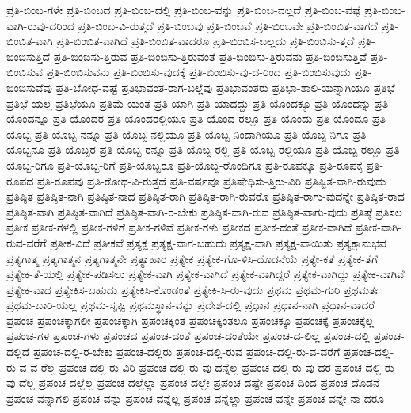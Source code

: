 {ಪ್ರತಿ-ಬಿಂಬ-ಗಳೇ
ಪ್ರತಿ-ಬಿಂಬದ
ಪ್ರತಿ-ಬಿಂಬ-ದಲ್ಲಿ
ಪ್ರತಿ-ಬಿಂಬ-ವನ್ನು
ಪ್ರತಿ-ಬಿಂಬ-ವಲ್ಲದೆ
ಪ್ರತಿ-ಬಿಂಬ-ವಷ್ಟೆ
ಪ್ರತಿ-ಬಿಂಬ-ವಾಗಿ-ರುವು-ದರಿಂದ
ಪ್ರತಿ-ಬಿಂಬ-ವಿ-ರುತ್ತದೆ
ಪ್ರತಿ-ಬಿಂಬವು
ಪ್ರತಿ-ಬಿಂಬವೆ
ಪ್ರತಿ-ಬಿಂಬವೇ
ಪ್ರತಿ-ಬಿಂಬಿತ-ವಾಗದೆ
ಪ್ರತಿ-ಬಿಂಬಿತ-ವಾಗಿ
ಪ್ರತಿ-ಬಿಂಬಿತ-ವಾಗಿದೆ
ಪ್ರತಿ-ಬಿಂಬಿತ-ವಾದರೂ
ಪ್ರತಿ-ಬಿಂಬಿಸ-ಬಲ್ಲದು
ಪ್ರತಿ-ಬಿಂಬಿಸು-ತ್ತದೆ
ಪ್ರತಿ-ಬಿಂಬಿಸುತ್ತಿದೆ
ಪ್ರತಿ-ಬಿಂಬಿಸು-ತ್ತಿರುವ
ಪ್ರತಿ-ಬಿಂಬಿಸು-ತ್ತಿರುವಂತೆ
ಪ್ರತಿ-ಬಿಂಬಿಸು-ತ್ತಿರುವನು
ಪ್ರತಿ-ಬಿಂಬಿಸುತ್ತಿವೆ
ಪ್ರತಿ-ಬಿಂಬಿಸುವ
ಪ್ರತಿ-ಬಿಂಬಿಸುವನು
ಪ್ರತಿ-ಬಿಂಬಿಸು-ವುದಕ್ಕೆ
ಪ್ರತಿ-ಬಿಂಬಿಸು-ವು-ದ-ರಿಂದ
ಪ್ರತಿ-ಬಿಂಬಿಸುವುದು
ಪ್ರತಿ-ಬಿಂಬಿಸುವೆವು
ಪ್ರತಿ-ಬೋಧ-ವಷ್ಟೆ
ಪ್ರತಿಭಾವಂತ-ರಾಗ-ಬಲ್ಲೆವು
ಪ್ರತಿಭಾವಂತರು
ಪ್ರತಿಭಾ-ಶಾಲಿ-ಯನ್ನಾಗಿಯೂ
ಪ್ರತಿಭೆ
ಪ್ರತಿಭೆ-ಯಲ್ಲ
ಪ್ರತಿಭೆಯೂ
ಪ್ರತಿಮೆ-ಯಂತೆ
ಪ್ರತಿ-ಯಾಗಿ
ಪ್ರತಿ-ಯಾದದ್ದು
ಪ್ರತಿ-ಯೊಂದಕ್ಕೂ
ಪ್ರತಿ-ಯೊಂದನ್ನು
ಪ್ರತಿ-ಯೊಂದನ್ನೂ
ಪ್ರತಿ-ಯೊಂದರ
ಪ್ರತಿ-ಯೊಂದರಲ್ಲಿಯೂ
ಪ್ರತಿ-ಯೊಂದ-ರಲ್ಲೂ
ಪ್ರತಿ-ಯೊಂದು
ಪ್ರತಿ-ಯೊಂದೂ
ಪ್ರತಿ-ಯೊಬ್ಬ
ಪ್ರತಿ-ಯೊಬ್ಬ-ನನ್ನೂ
ಪ್ರತಿ-ಯೊಬ್ಬ-ನಲ್ಲಿಯೂ
ಪ್ರತಿ-ಯೊಬ್ಬ-ನಿಂದಾಗಿಯೂ
ಪ್ರತಿ-ಯೊಬ್ಬ-ನಿಗೂ
ಪ್ರತಿ-ಯೊಬ್ಬನೂ
ಪ್ರತಿ-ಯೊಬ್ಬರ
ಪ್ರತಿ-ಯೊಬ್ಬ-ರನ್ನೂ
ಪ್ರತಿ-ಯೊಬ್ಬ-ರಲ್ಲಿ
ಪ್ರತಿ-ಯೊಬ್ಬ-ರಲ್ಲಿಯೂ
ಪ್ರತಿ-ಯೊಬ್ಬ-ರಲ್ಲೂ
ಪ್ರತಿ-ಯೊಬ್ಬ-ರಿಗೂ
ಪ್ರತಿ-ಯೊಬ್ಬ-ರಿಗೆ
ಪ್ರತಿ-ಯೊಬ್ಬರೂ
ಪ್ರತಿ-ಯೊಬ್ಬ-ರೊಂದಿಗೂ
ಪ್ರತಿ-ರೂಪಕ್ಕೂ
ಪ್ರತಿ-ರೂಪಕ್ಕೆ
ಪ್ರತಿ-ರೂಪದ
ಪ್ರತಿ-ರೂಪವು
ಪ್ರತಿ-ರೋಧ-ವಿ-ರುತ್ತದೆ
ಪ್ರತಿ-ವರ್ಷವೂ
ಪ್ರತಿಷೇಧಿಸು-ತ್ತಿರು-ವಿರಿ
ಪ್ರತಿಷ್ಟಿತ-ವಾಗಿ-ರುವುದು
ಪ್ರತಿಷ್ಠಿತ
ಪ್ರತಿಷ್ಠಿತ-ನಾಗಿ
ಪ್ರತಿಷ್ಠಿತ-ನಾದ
ಪ್ರತಿಷ್ಠಿತ-ರಾಗಿ
ಪ್ರತಿಷ್ಠಿತ-ರಾಗಿ-ರುವರೊ
ಪ್ರತಿಷ್ಠಿತ-ರಾಗು-ವುದನ್ನೇ
ಪ್ರತಿಷ್ಠಿತ-ರಾದ
ಪ್ರತಿಷ್ಠಿತ-ವಾಗಿ
ಪ್ರತಿಷ್ಠಿತ-ವಾಗಿದೆ
ಪ್ರತಿಷ್ಠಿತ-ವಾಗಿ-ರ-ಬೇಕು
ಪ್ರತಿಷ್ಠಿತ-ವಾಗಿ-ರುವ
ಪ್ರತಿಷ್ಠಿತ-ವಾಗು-ವುದು
ಪ್ರತಿಷ್ಠೆ
ಪ್ರತಿಸಲ
ಪ್ರತೀಕ
ಪ್ರತೀಕ-ಗಳಲ್ಲಿ
ಪ್ರತೀಕ-ಗಳಿಗೆ
ಪ್ರತೀಕ-ಗಳಿವೆ
ಪ್ರತೀಕ-ಗಳು
ಪ್ರತೀಕದ
ಪ್ರತೀಕ-ದಂತೆ
ಪ್ರತೀಕ-ವಾಗಿದೆ
ಪ್ರತೀಕ-ವಾಗಿ-ರುವ-ವರೆಗೆ
ಪ್ರತೀಕ-ವಿದೆ
ಪ್ರತೀಕವೆ
ಪ್ರತ್ಯಕ್ಷ
ಪ್ರತ್ಯಕ್ಷ-ವಾಗ-ಬಹುದು
ಪ್ರತ್ಯಕ್ಷ-ವಾಗಿ
ಪ್ರತ್ಯಕ್ಷ-ವಾಯಿತು
ಪ್ರತ್ಯಕ್ಷಾನುಭವ
ಪ್ರತ್ಯಗಾತ್ಮ
ಪ್ರತ್ಯಗಾತ್ಮನ
ಪ್ರತ್ಯಗಾತ್ಮನೇ
ಪ್ರತ್ಯಾಹಾರ
ಪ್ರತ್ಯೇಕ
ಪ್ರತ್ಯೇಕ-ಗೊ-ಳಿಸಿ-ದೊಡನೆಯೆ
ಪ್ರತ್ಯೇ-ಕತೆ
ಪ್ರತ್ಯೇಕ-ತೆಗೆ
ಪ್ರತ್ಯೇಕ-ತೆ-ಯಲ್ಲಿ
ಪ್ರತ್ಯೇಕ-ಪಡಿಸಲು
ಪ್ರತ್ಯೇಕ-ವಾಗಿ
ಪ್ರತ್ಯೇಕ-ವಾಗಿದೆ
ಪ್ರತ್ಯೇಕ-ವಾಗಿದ್ದರೆ
ಪ್ರತ್ಯೇಕ-ವಾಗಿದ್ದು
ಪ್ರತ್ಯೇಕ-ವಾಗಿವೆ
ಪ್ರತ್ಯೇಕ-ವಾದ
ಪ್ರತ್ಯೇಕಿಸ-ಬಹುದು
ಪ್ರತ್ಯೇಕಿಸಿ-ಕೊಂಡಂತೆ
ಪ್ರತ್ಯೇಕಿ-ಸಿ-ರು-ವುದು
ಪ್ರಥಮ
ಪ್ರಥಮ-ಗುರಿ
ಪ್ರಥಮತಃ
ಪ್ರಥಮ-ಬಾರಿ-ಯಲ್ಲ
ಪ್ರಥಮ-ಸೃಷ್ಟಿ
ಪ್ರಥಮಸ್ಥಾನ-ವನ್ನು
ಪ್ರದೇಶ-ದಲ್ಲಿ
ಪ್ರಧಾನ
ಪ್ರಧಾನ-ನಾಗಿ
ಪ್ರಧಾನ-ವಾದರೆ
ಪ್ರಪಂಚ
ಪ್ರಪಂಚಕ್ಕಾಗಲೀ
ಪ್ರಪಂಚಕ್ಕಾಗಿ
ಪ್ರಪಂಚಕ್ಕಿಂತ
ಪ್ರಪಂಚಕ್ಕಿಂತಲೂ
ಪ್ರಪಂಚಕ್ಕೂ
ಪ್ರಪಂಚಕ್ಕೆ
ಪ್ರಪಂಚಕ್ಕೆಲ್ಲ
ಪ್ರಪಂಚ-ಗಳ
ಪ್ರಪಂಚ-ಗಳು
ಪ್ರಪಂಚದ
ಪ್ರಪಂಚ-ದಂತೆ
ಪ್ರಪಂಚ-ದಂತೆಯೇ
ಪ್ರಪಂಚ-ದ-ಲಿಲ್ಲ
ಪ್ರಪಂಚ-ದಲ್ಲಿ
ಪ್ರಪಂಚ-ದಲ್ಲಿದೆ
ಪ್ರಪಂಚ-ದಲ್ಲಿ-ರ-ಬೇಕು
ಪ್ರಪಂಚ-ದಲ್ಲಿರು
ಪ್ರಪಂಚ-ದಲ್ಲಿ-ರುವ
ಪ್ರಪಂಚ-ದಲ್ಲಿ-ರು-ವ-ವರೆಗೆ
ಪ್ರಪಂಚ-ದಲ್ಲಿ-ರು-ವ-ವ-ರೆಲ್ಲ
ಪ್ರಪಂಚ-ದಲ್ಲಿ-ರು-ವಿರಿ
ಪ್ರಪಂಚ-ದಲ್ಲಿ-ರು-ವು-ದನ್ನೆಲ್ಲ
ಪ್ರಪಂಚ-ದಲ್ಲಿ-ರು-ವು-ದರ
ಪ್ರಪಂಚ-ದಲ್ಲಿ-ರು-ವು-ದೆಲ್ಲ
ಪ್ರಪಂಚ-ದಲ್ಲೆಲ್ಲ
ಪ್ರಪಂಚ-ದಲ್ಲೆಲ್ಲಾ
ಪ್ರಪಂಚ-ದಲ್ಲೇ
ಪ್ರಪಂಚ-ದಷ್ಟೇ
ಪ್ರಪಂಚ-ದಿಂದ
ಪ್ರಪಂಚ-ದೊಡನೆ
ಪ್ರಪಂಚ-ವನ್ನಾಗಲಿ
ಪ್ರಪಂಚ-ವನ್ನು
ಪ್ರಪಂಚ-ವನ್ನೆಲ್ಲ
ಪ್ರಪಂಚ-ವನ್ನೆಲ್ಲಾ
ಪ್ರಪಂಚ-ವನ್ನೇ
ಪ್ರಪಂಚ-ವನ್ನೇ-ನಾ-ದರೂ
}
